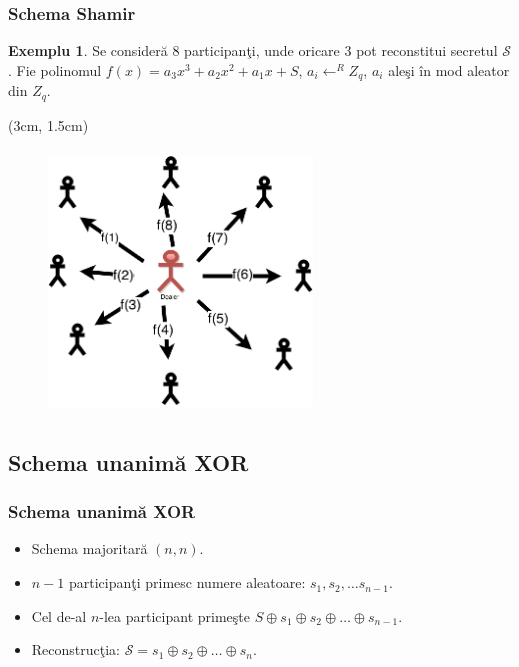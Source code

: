 \documentclass{beamer}
\theoremstyle{definition}
\newtheorem{my_example}[theorem]{Exemplu}
\begin{document}
\begin{frame}
    \frametitle{Schema Shamir}
     {
        \begin{my_example}
           Se consider\u{a} 8 participan\c{t}i, unde oricare $3$ pot reconstitui secretul $\mathcal{S}$.
           Fie polinomul $f(x) = a_3x ^ 3 + a_2x ^ 2 + a_1x + S$, $a_i \leftarrow^R Z_q$, $a_i$ ale\c{s}i \^{i}n mod aleator din $Z_q$.
        \end{my_example}
    }
     {
     \begin{textblock*}{4cm}(3cm, 1.5cm)
        \begin{figure}
            \includegraphics[width=7cm,height=7cm,keepaspectratio]{img/shamir/shamir-split.png}
       \end{figure}
        \end{textblock*}
 
    }
\end{frame}

\subsection{Schema unanim\u{a} XOR}
\begin{frame}
    \frametitle{Schema unanim\u{a} XOR}
    \begin{itemize}
        \item Schema majoritar\u{a} $(n,n)$.
        \pause
        \item $n-1$ participan\c{t}i primesc numere aleatoare: $s_1, s_2, \dots s_{n-1}$.
        \pause
        \item Cel de-al $n$-lea participant prime\c{s}te $S \oplus s_1 \oplus s_2 \oplus \dots \oplus s_{n-1}$.
        \pause
        \item Reconstruc\c{t}ia: $\mathcal{S} = s_1 \oplus s_2 \oplus \dots \oplus s_n$.
    \end{itemize}
\end{frame}
\end{document}
